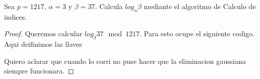 \begin{Pro}
    Sea $p = 1217$, $\alpha =3$ y $\beta = 37$. Calcula $log_{\alpha}\beta$ mediante el algoritmo 
    de Calculo de indices.  
\end{Pro}

\begin{proof}
    \hspace{5mm}

    Queremos calcular $log_{3} 37 \mod 1217$. Para esto ocupe el siguiente codigo. Aqui deifinimos las llaves 
    
    
    Quiero aclarar que cuando lo corri no puse hacer que la eliminacion gaussiana siempre funcionara.
\end{proof}
